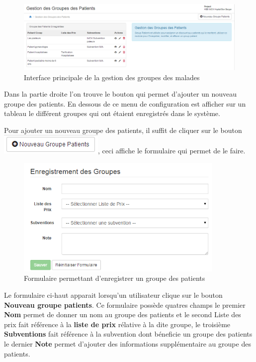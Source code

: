 \documentclass[12pt,a4paper]{report}
\begin{document}
\begin{figure}[h]
\begin{center}
\includegraphics[width=16cm]{pic/AdminGroupPatient.png}
\end{center}
\caption{Interface principale de la gestion des groupes des malades}
\label{Interface principale de la gestion des groupes des malades}
\end{figure}

Dans la partie droite l'on trouve le bouton qui permet d'ajouter un nouveau groupe des patients. En dessous de ce menu de configuration est afficher sur un tableau le différent groupes qui ont étaient enregistrés dans le système. 

Pour ajouter un nouveau groupe des patients, il suffit de cliquer sur le bouton \includegraphics[scale=0.7]{pic/NewGroupPatient.png}, ceci affiche le formulaire qui permet de le faire.

\begin{figure}[h]
\begin{center}
\includegraphics[width=10cm]{pic/FormGroupPatient.png}
\end{center}
\caption{Formulaire permettant d'enregistrer un groupe des patients}
\label{Formulaire permettant d'enregistrer un groupe des patients}
\end{figure}

Le formulaire ci-haut apparait lorsqu'un utilisateur clique sur le bouton \textbf{Nouveau groupe patients}. Ce formulaire possède quatres champs le premier \textbf{Nom} permet de donner un nom au groupe des patients et le second Liste des prix fait référence à la \textbf{liste de prix} rélative à la dite groupe, le troisième \textbf{Subventions} fait référence à la subvention dont béneficie un groupe des patients le dernier \textbf{Note} permet d'ajouter des informations supplémentaire au groupe des patients.
\end{document}
